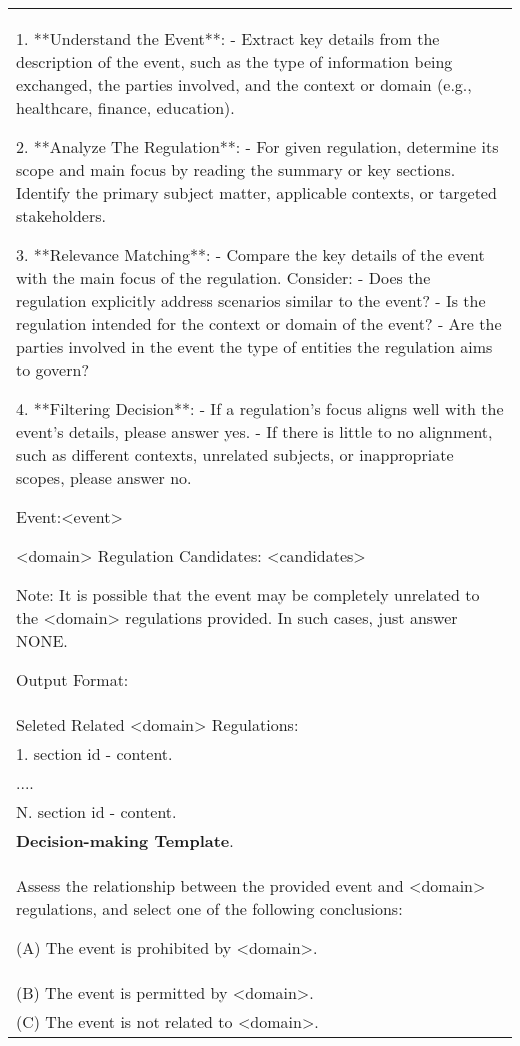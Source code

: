 \begin{table*}[t!]
\begin{tabular}{p{}}
1. **Understand the Event**:
   - Extract key details from the description of the event, such as the type of information being exchanged, the parties involved, and the context or domain (e.g., healthcare, finance, education).

2. **Analyze The Regulation**:
   - For given regulation, determine its scope and main focus by reading the summary or key sections. Identify the primary subject matter, applicable contexts, or targeted stakeholders.

3. **Relevance Matching**:
   - Compare the key details of the event with the main focus of the regulation. Consider:
     - Does the regulation explicitly address scenarios similar to the event?
     - Is the regulation intended for the context or domain of the event?
     - Are the parties involved in the event the type of entities the regulation aims to govern?

4. **Filtering Decision**:
   - If a regulation's focus aligns well with the event’s details, please answer yes.
   - If there is little to no alignment, such as different contexts, unrelated subjects, or inappropriate scopes, please answer no.

Event:\textcolor{contentcolor}{<event>}

\textcolor{contentcolor}{<domain>} Regulation Candidates:
\textcolor{contentcolor}{<candidates>}

Note:
It is possible that the event may be completely unrelated to the \textcolor{contentcolor}{<domain>} regulations provided. In such cases, just answer NONE.


Output Format:\\
Seleted Related \textcolor{contentcolor}{<domain>} Regulations:\\
1. section id - content.\\
....\\
N. section id - content.\\

\midrule
\textbf{Decision-making Template}.\\
Assess the relationship between the provided event and \textcolor{contentcolor}{<domain>} regulations, and select one of the following conclusions:

(A) The event is prohibited by \textcolor{contentcolor}{<domain>}.\\
(B) The event is permitted by \textcolor{contentcolor}{<domain>}.\\
(C) The event is not related to \textcolor{contentcolor}{<domain>}.\\


\end{tabular}
\end{table*}
